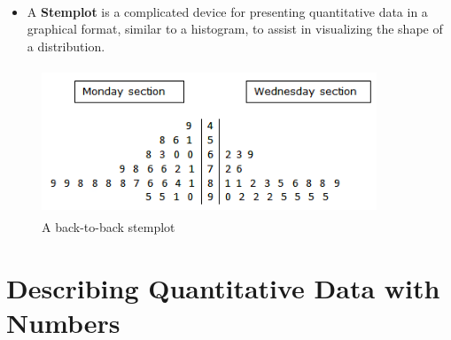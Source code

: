 \documentclass[Main.tex]{subfiles}
\begin{document}
	\begin{example}[Stemplot] \hfill \\
		
		\begin{itemize}
			\item A \textbf{Stemplot} is a complicated device for presenting quantitative data in a graphical format, similar to a histogram, to assist in visualizing the shape of a distribution.
		\end{itemize}
		\begin{figure}[H]
			\centering
			\includegraphics[height=4.4cm,width=10cm]{BTBStemplot}
			\caption{A back-to-back stemplot}
			\label{stemplot}
		\end{figure}
	\end{example}
	\newpage
	
	\section{Describing Quantitative Data with Numbers}
	
\end{document}
